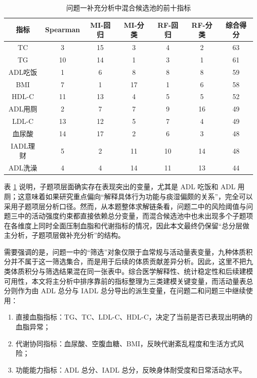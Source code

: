 \documentclass{MathorCupmodeling}
\begin{document}
					\begin{table}[H]
						\centering
						\caption{问题一补充分析中混合候选池的前十指标}\label{tab:q1_item_alt}
						\begin{tabularx}{0.96\textwidth}{c c c c c c c}
							\toprule
							指标 & Spearman & MI-回归 & MI-分类 & RF-回归 & RF-分类 & 综合得分\\
							\midrule
							TC & 3 & 15 & 3 & 4 & 2 & 63\\
							TG & 10 & 14 & 1 & 3 & 1 & 61\\
							ADL吃饭 & 1 & 6 & 8 & 8 & 8 & 59\\
							BMI & 7 & 1 & 17 & 1 & 6 & 58\\
							HDL-C & 11 & 13 & 4 & 5 & 5 & 52\\
							ADL用厕 & 2 & 7 & 7 & 9 & 16 & 49\\
							LDL-C & 13 & 12 & 5 & 7 & 4 & 49\\
							血尿酸 & 14 & 17 & 2 & 6 & 3 & 48\\
							IADL理财 & 5 & 2 & 11 & 10 & 14 & 48\\
							ADL洗澡 & 4 & 4 & 14 & 11 & 13 & 44\\
							\bottomrule
						\end{tabularx}
					\end{table}
					
					表 \ref{tab:q1_item_alt} 说明，子题项层面确实存在表现突出的变量，尤其是 ADL 吃饭和 ADL 用厕；这意味着如果研究重点偏向“解释具体行为功能与痰湿偏颇的关系”，完全可以采用子题项层分析口径。然而，从本题整体求解链条看，问题二中的风险阈值与问题三中的活动强度约束都直接依赖总分变量，而混合候选池中也未出现多个子题项在各维度上同时全面压制血脂和代谢指标的情况，因此本文最终仍保留“总分层做主分析，子题项层做补充分析”的结构。
					
					需要强调的是，问题一中的“筛选”对象仅限于血常规与活动量表变量，九种体质积分并不属于这一筛选集合，而是用于后续的体质贡献差异分析。因此，这里不把九类体质积分与筛选结果混在同一张表中。综合医学解释性、统计稳定性和后续建模可用性，本文将主分析中排序靠前的指标整理为三类建模关键变量，而活动量表总分则作为由 ADL 总分与 IADL 总分导出的派生变量，在问题二和问题三中继续使用：
			\begin{enumerate}
				\item 直接血脂指标：TG、TC、LDL-C、HDL-C，决定了当前是否已表现出明确的血脂异常；
				\item 代谢协同指标：血尿酸、空腹血糖、BMI，反映代谢紊乱程度和生活方式风险；
				\item 功能能力指标：ADL 总分、IADL 总分，反映身体耐受度和日常活动水平。
		\end{enumerate}
	
\end{document}
